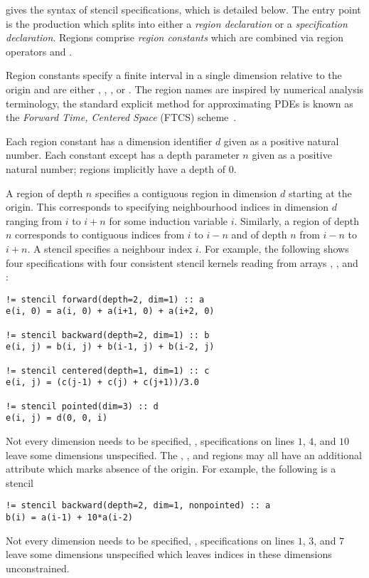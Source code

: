 \documentclass[acmlarge,review,anonymous]{acmart}\settopmatter{printfolios=true}
\theoremstyle{definition}
\theoremstyle{plain}
\theoremstyle{remark}
\begin{document}
 gives the syntax of stencil specifications, which is
detailed below. The entry point is the  production which
splits into either a \emph{region declaration} or a \emph{specification
declaration}.
Regions comprise \emph{region constants} which are
combined via region operators \term{+} and \term{*}.

Region constants specify a finite interval in a 
single dimension relative to the origin and are either ,
, , or . The region names are
inspired by numerical analysis terminology, \eg{} the standard explicit method for
approximating PDEs is known as the \emph{Forward Time, Centered Space} (FTCS)
scheme~\citep{dawson1991finite}.

Each region
constant has a dimension identifier $d$ given as a positive natural number.
Each constant except  has a depth
parameter $n$ given as a positive natural number; 
regions implicitly have a depth of $0$.

A  region of depth $n$ specifies a contiguous
region in dimension $d$ starting at the origin. This corresponds
to specifying neighbourhood indices in dimension $d$ ranging from $i$ to $i + n$
for some induction variable $i$. Similarly, a
 region of depth $n$ corresponds to contiguous indices
from $i$ to $i - n$ and 
of depth $n$ from $i - n$ to $i + n$. A 
stencil specifies a neighbour index $i$. For example, the
following shows four specifications with four consistent stencil
kernels reading from arrays , ,  and :
\begin{verbatim}
!= stencil forward(depth=2, dim=1) :: a
e(i, 0) = a(i, 0) + a(i+1, 0) + a(i+2, 0)

!= stencil backward(depth=2, dim=1) :: b
e(i, j) = b(i, j) + b(i-1, j) + b(i-2, j)

!= stencil centered(depth=1, dim=1) :: c
e(i, j) = (c(j-1) + c(j) + c(j+1))/3.0

!= stencil pointed(dim=3) :: d
e(i, j) = d(0, 0, i)
\end{verbatim}
Not every dimension needs to be specified, \eg{},
specifications on lines $1$, $4$, and $10$ leave some dimensions unspecified.
The , , and  regions may
all have an additional attribute  which marks absence
of the origin.  For example, the following is a
  stencil
%
\begin{verbatim}
!= stencil backward(depth=2, dim=1, nonpointed) :: a
b(i) = a(i-1) + 10*a(i-2)
\end{verbatim}
%
Not every dimension needs to be specified, \eg{},
specifications on lines $1$, $3$, and $7$ leave some dimensions
unspecified which leaves indices in these dimensions unconstrained.
\end{document}
